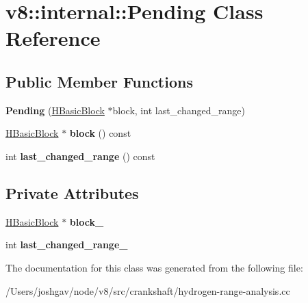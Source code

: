\hypertarget{classv8_1_1internal_1_1_pending}{}\section{v8\+:\+:internal\+:\+:Pending Class Reference}
\label{classv8_1_1internal_1_1_pending}
\subsection*{Public Member Functions}
\begin{DoxyCompactItemize}
\item 
{\bfseries Pending} (\hyperlink{classv8_1_1internal_1_1_h_basic_block}{H\+Basic\+Block} $\ast$block, int last\+\_\+changed\+\_\+range)\hypertarget{classv8_1_1internal_1_1_pending_aa8c2332f59eb008539156e85ba7f8cbf}{}\label{classv8_1_1internal_1_1_pending_aa8c2332f59eb008539156e85ba7f8cbf}

\item 
\hyperlink{classv8_1_1internal_1_1_h_basic_block}{H\+Basic\+Block} $\ast$ {\bfseries block} () const \hypertarget{classv8_1_1internal_1_1_pending_a83ddbe587f4c6c8bb2cf1c12e9700fd3}{}\label{classv8_1_1internal_1_1_pending_a83ddbe587f4c6c8bb2cf1c12e9700fd3}

\item 
int {\bfseries last\+\_\+changed\+\_\+range} () const \hypertarget{classv8_1_1internal_1_1_pending_a9a64273a6d65131d45cf8b2a4d20e5c7}{}\label{classv8_1_1internal_1_1_pending_a9a64273a6d65131d45cf8b2a4d20e5c7}

\end{DoxyCompactItemize}
\subsection*{Private Attributes}
\begin{DoxyCompactItemize}
\item 
\hyperlink{classv8_1_1internal_1_1_h_basic_block}{H\+Basic\+Block} $\ast$ {\bfseries block\+\_\+}\hypertarget{classv8_1_1internal_1_1_pending_ac08e26c3c2975dbffd1c104fa1c2b9a1}{}\label{classv8_1_1internal_1_1_pending_ac08e26c3c2975dbffd1c104fa1c2b9a1}

\item 
int {\bfseries last\+\_\+changed\+\_\+range\+\_\+}\hypertarget{classv8_1_1internal_1_1_pending_a6140aecda6dd5da6ee7aaa821b97561a}{}\label{classv8_1_1internal_1_1_pending_a6140aecda6dd5da6ee7aaa821b97561a}

\end{DoxyCompactItemize}


The documentation for this class was generated from the following file\+:\begin{DoxyCompactItemize}
\item 
/\+Users/joshgav/node/v8/src/crankshaft/hydrogen-\/range-\/analysis.\+cc\end{DoxyCompactItemize}

